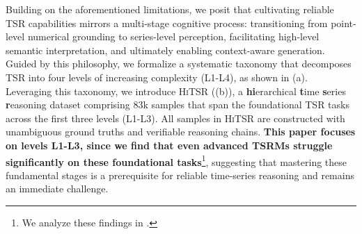 \documentclass[11pt]{article}
\begin{document}
Building on the aforementioned limitations, we posit that cultivating reliable TSR capabilities mirrors a multi-stage cognitive process: transitioning from point-level numerical grounding to series-level perception, facilitating high-level semantic interpretation, and ultimately enabling context-aware generation. 
Guided by this philosophy, we formalize a systematic taxonomy that decomposes TSR into four levels of increasing complexity (L1-L4), as shown in (a). Leveraging this taxonomy, we introduce \textsc{HiTSR} ((b)), a \textbf{hi}erarchical \textbf{t}ime \textbf{s}eries \textbf{r}easoning dataset comprising 83k samples that span the foundational TSR tasks across the first three levels (L1-L3). All samples in \textsc{HiTSR} are constructed with unambiguous ground truths and verifiable reasoning chains. 
\textbf{This paper focuses on levels L1-L3, since we find that even advanced TSRMs struggle significantly on these foundational tasks}\footnote{We analyze these findings in .}, suggesting that mastering these fundamental stages is a prerequisite for reliable time-series reasoning and remains an immediate challenge.
\end{document}
